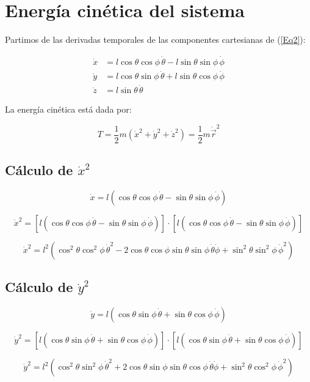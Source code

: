 \documentclass[12pt]{article}
\begin{document}
\section*{Energía cinética del sistema}

Partimos de las derivadas temporales de las componentes cartesianas de (\ref{Eq2}):

\[
\begin{aligned}
\dot{x} &= l \cos\theta \cos\phi \, \dot{\theta} - l \sin\theta \sin\phi \, \dot{\phi} \\
\dot{y} &= l \cos\theta \sin\phi \, \dot{\theta} + l \sin\theta \cos\phi \, \dot{\phi} \\
\dot{z} &= l \sin\theta \, \dot{\theta}
\end{aligned}
\]

La energía cinética está dada por:

\[
T = \frac{1}{2} m \left( \dot{x}^2 + \dot{y}^2 + \dot{z}^2 \right) = \frac{1}{2}m \dot \vec {r}^{2}
\]

\subsection*{ Cálculo de \(\dot{x}^2\)}

\[
\dot{x} = l (\cos\theta \cos\phi \, \dot{\theta} - \sin\theta \sin\phi \, \dot{\phi})
\]

\[
\dot{x}^{2} = [l (\cos\theta \cos\phi \, \dot{\theta} - \sin\theta \sin\phi \, \dot{\phi})] \cdot [l (\cos\theta \cos\phi \, \dot{\theta} - \sin\theta \sin\phi \, \dot{\phi})]
\]

\[
\dot{x}^2 = l^2 \left( \cos^2\theta \cos^2\phi \, \dot{\theta}^2 - 2 \cos\theta \cos\phi \sin\theta \sin\phi \, \dot{\theta} \dot{\phi} + \sin^2\theta \sin^2\phi \, \dot{\phi}^2 \right)
\]

\subsection*{Cálculo de \(\dot{y}^2\)}

\[
\dot{y} = l (\cos\theta \sin\phi \, \dot{\theta} + \sin\theta \cos\phi \, \dot{\phi})
\]

\[
\dot{y}^{2} = [l (\cos\theta \sin\phi \, \dot{\theta} + \sin\theta \cos\phi \, \dot{\phi})]\cdot[l (\cos\theta \sin\phi \, \dot{\theta} + \sin\theta \cos\phi \, \dot{\phi})]
\]

\[
\dot{y}^2 = l^2 \left( \cos^2\theta \sin^2\phi \, \dot{\theta}^2 + 2 \cos\theta \sin\phi \sin\theta \cos\phi \, \dot{\theta} \dot{\phi} + \sin^2\theta \cos^2\phi \, \dot{\phi}^2 \right)
\]
\end{document}

